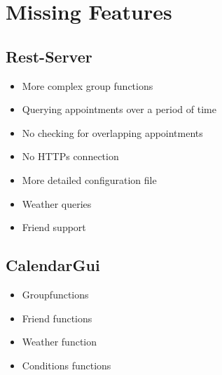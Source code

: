 \documentclass[12pt]{scrartcl}
\begin{document}
    \section{Missing Features}
    \subsection{Rest-Server}
    \begin{itemize}
        \item More complex group functions
        \item Querying appointments over a period of time
        \item No checking for overlapping appointments
        \item No HTTPs connection
        \item More detailed configuration file
        \item Weather queries
        \item Friend support
    \end{itemize}
    \subsection{CalendarGui}
    \begin{itemize}
        \item Groupfunctions
        \item Friend functions
        \item Weather function
        \item Conditions functions
    \end{itemize}

\end{document}
